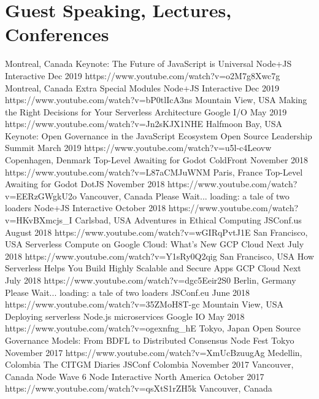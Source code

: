 \documentclass[11pt,a4paper,sans]{moderncv}   %
\begin{document}
\section{Guest Speaking, Lectures, Conferences}
\cventry
  {Montreal, Canada}
  {Keynote: The Future of JavaScript is Universal}
  {Node+JS Interactive}
  {Dec 2019}{}
  {https://www.youtube.com/watch?v=o2M7g8Xwc7g}
\cventry
  {Montreal, Canada}
  {Extra Special Modules}
  {Node+JS Interactive}
  {Dec 2019}{}
  {https://www.youtube.com/watch?v=bP0tlIcA3ns}
\cventry
  {Mountain View, USA}
  {Making the Right Decisions for Your Serverless Architecture}
  {Google I/O}
  {May 2019}{}
  {https://www.youtube.com/watch?v=Jn2sKJX1NHE}
\cventry
  {Halfmoon Bay, USA}
  {Keynote: Open Governance in the JavaScript Ecosystem}
  {Open Source Leadership Summit}
  {March 2019}{}
  {https://www.youtube.com/watch?v=u5l-c4Leovw}
\cventry
  {Copenhagen, Denmark}
  {Top-Level Awaiting for Godot}
  {ColdFront}
  {November 2018}{}
  {https://www.youtube.com/watch?v=L87aCMJuWNM}
\cventry
  {Paris, France}
  {Top-Level Awaiting for Godot}
  {DotJS}
  {November 2018}{}
  {https://www.youtube.com/watch?v=EERzGWgkU2o}
\cventry
  {Vancouver, Canada}
  {Please Wait... loading: a tale of two loaders}
  {Node+JS Interactive}
  {October 2018}{}
  {https://www.youtube.com/watch?v=HKvBXmcjs\_I}
\cventry
  {Carlsbad, USA}
  {Adventures in Ethical Computing}
  {JSConf.us}
  {August 2018}{}
  {https://www.youtube.com/watch?v=wGIRqPvtJ1E}
\cventry
  {San Francisco, USA}
  {Serverless Compute on Google Cloud: What's New}
  {GCP Cloud Next}
  {July 2018}{}
  {https://www.youtube.com/watch?v=Y1sRy0Q2qig}
\cventry
  {San Francisco, USA}
  {How Serverless Helps You Build Highly Scalable and Secure Apps}
  {GCP Cloud Next}
  {July 2018}{}
  {https://www.youtube.com/watch?v=dgc5Eeir2S0}
\cventry
  {Berlin, Germany}
  {Please Wait... loading: a tale of two loaders}
  {JSConf.eu}
  {June 2018}{}
  {https://www.youtube.com/watch?v=35ZMoH8T-gc}
\cventry
  {Mountain View, USA}
  {Deploying serverless Node.js microservices}
  {Google I\/O}
  {May 2018}{}
  {https://www.youtube.com/watch?v=ogexnfng\_hE}
\cventry
  {Tokyo, Japan}
  {Open Source Governance Models: From BDFL to Distributed Consensus}
  {Node Fest Tokyo}
  {November 2017}{}
  {https://www.youtube.com/watch?v=XmUcBzuugAg}
\cventry
  {Medellin, Colombia}
  {The CITGM Diaries}
  {JSConf Colombia}
  {November 2017}{}
  {}
\cventry
  {Vancouver, Canada}
  {Node Wave 6}
  {Node Interactive North America}
  {October 2017}{}
  {https://www.youtube.com/watch?v=qsXtS1rZH5k}
\cventry
  {Vancouver, Canada}
\end{document}

